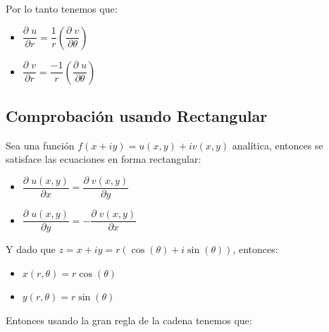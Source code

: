 \documentclass[12pt, fleqn]{report}                             %
\theoremstyle{break}                                            %
\newcommand{\Wrap}[1]           {\left( #1 \right)}             %
\newcommand{\Cos}[1] {\cos\Wrap{#1}}                            %
\newcommand{\Sin}[1] {\sin\Wrap{#1}}                            %
\newcommand \Cis[1]  {\Cos{#1} + i \Sin{#1}}                    %
\newcommand \Partial[2] {\dfrac{\partial \; #1}{\partial #2}}   %
\begin{document}
                Por lo tanto tenemos que:
                \begin{itemize}
                    \item $\Partial{u}{r} = \dfrac{1}{r} \Wrap{\Partial{v}{\theta}} $
                    \item $\Partial{v}{r} = \dfrac{-1}{r}\Wrap{\Partial{u}{\theta}} $
                \end{itemize}



            \clearpage
            \subsection{Comprobación usando Rectangular}

                Sea una función $f(x+iy) = u(x, y) + iv(x, y)$ analítica, entonces se
                satisface las ecuaciones en forma rectangular:

                \begin{itemize}
                    \item $\Partial{u(x, y)}{x} =   \Partial{v(x, y)}{y}$
                    \item $\Partial{u(x, y)}{y} = - \Partial{v(x, y)}{x}$
                \end{itemize}

                Y dado que $z = x + iy = r(\Cis{\theta})$, entonces:

                \begin{itemize}
                    \item $x(r, \theta) = r\Cos{\theta}$
                    \item $y(r, \theta) = r\Sin{\theta}$
                \end{itemize}

                Entonces usando la gran regla de la cadena tenemos que:
\end{document}
